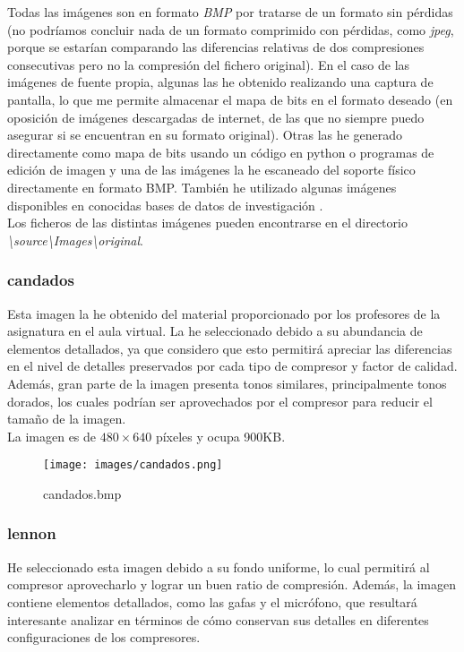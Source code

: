 \documentclass[12pt,a4paper]{article}
\begin{document}
Todas las imágenes son en formato \textit{BMP} por tratarse de un formato sin pérdidas (no podríamos concluir nada de un formato comprimido con pérdidas, como \textit{jpeg}, porque se estarían comparando las diferencias relativas de dos compresiones consecutivas pero no la compresión del fichero original). En el caso de las imágenes de fuente propia, algunas las he obtenido realizando una captura de pantalla, lo que me permite almacenar el mapa de bits en el formato deseado (en oposición de imágenes descargadas de internet, de las que no siempre puedo asegurar si se encuentran en su formato original). Otras las he generado directamente como mapa de bits usando un código en python o programas de edición de imagen y una de las imágenes la he escaneado del soporte físico directamente en formato BMP. También he utilizado algunas imágenes disponibles en conocidas bases de datos de investigación \cite{USCSIPI-Database}.\\

Los ficheros de las distintas imágenes pueden encontrarse en el directorio \textit{\textbackslash source\textbackslash Images\textbackslash original}.

\subsubsection{candados}
Esta imagen la he obtenido del material proporcionado por los profesores de la asignatura en el aula virtual. La he seleccionado debido a su abundancia de elementos detallados, ya que considero que esto permitirá apreciar las diferencias en el nivel de detalles preservados por cada tipo de compresor y factor de calidad. Además, gran parte de la imagen presenta tonos similares, principalmente tonos dorados, los cuales podrían ser aprovechados por el compresor para reducir el tamaño de la imagen.\\

La imagen es de $480\times640$ píxeles y ocupa 900KB.\\

\begin{figure}[H]
    \centering
    \texttt{[image: images/candados.png]}
    \caption{candados.bmp}
    
\end{figure}

\subsubsection{lennon}
He seleccionado esta imagen debido a su fondo uniforme, lo cual permitirá al compresor aprovecharlo y lograr un buen ratio de compresión. Además, la imagen contiene elementos detallados, como las gafas y el micrófono, que resultará interesante analizar en términos de cómo conservan sus detalles en diferentes configuraciones de los compresores.\\
\end{document}
